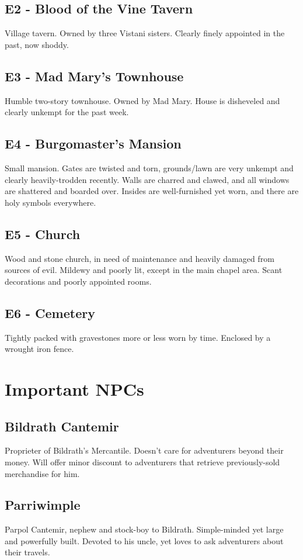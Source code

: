 \documentclass[a4paper,11pt]{article}
\begin{document}
\subsection{E2 - Blood of the Vine Tavern}
  Village tavern. Owned by three Vistani sisters. Clearly finely appointed in the past, now shoddy.
\subsection{E3 - Mad Mary's Townhouse}
  Humble two-story townhouse. Owned by Mad Mary. House is disheveled and clearly unkempt for the past week.
\subsection{E4 - Burgomaster's Mansion}
  Small mansion. Gates are twisted and torn, grounds/lawn are very unkempt and clearly heavily-trodden recently.
  Walls are charred and clawed, and all windows are shattered and boarded over. Insides are well-furnished yet
  worn, and there are holy symbols everywhere.
\subsection{E5 - Church}
  Wood and stone church, in need of maintenance and heavily damaged from sources of evil. Mildewy and poorly 
  lit, except in the main chapel area. Scant decorations and poorly appointed rooms.
\subsection{E6 - Cemetery}
  Tightly packed with gravestones more or less worn by time. Enclosed by a wrought iron fence.

\pagebreak
\section{Important NPCs}
\label{sec:ImportantNPCs}
\subsection{Bildrath Cantemir}
  Proprieter of Bildrath's Mercantile. Doesn't care for adventurers beyond their money. Will offer minor discount
  to adventurers that retrieve previously-sold merchandise for him.
\subsection{Parriwimple}
  Parpol Cantemir, nephew and stock-boy to Bildrath. Simple-minded yet large and powerfully built. Devoted to 
  his uncle, yet loves to ask adventurers about their travels.
\end{document}
